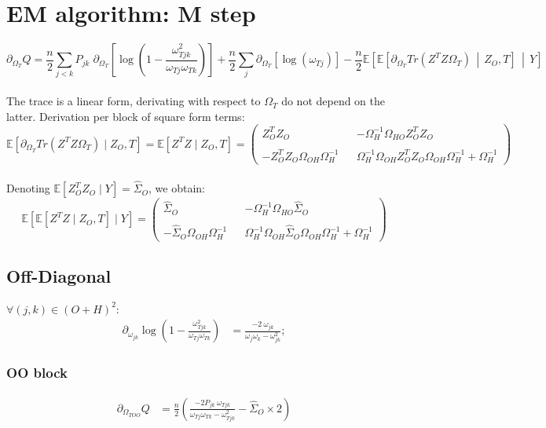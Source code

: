 \documentclass[11pt,a4paper]{article}
\newcommand{\Esp}{\mathds{E}}
\begin{document}
\section{EM algorithm: M step}
$$  \partial_{\Omega_T}Q = \frac{n}{2}\sum_{j<k}P_{jk}\; \partial_{\Omega_T}\left[\log\left(1-\frac{\omega_{Tjk}^2}{\omega_{Tj}\omega_{Tk}}\right)\right]+\frac{n}{2}\sum_j \partial_{\Omega_T} \left[\log(\omega_{Tj})\right] -\frac{n}{2}\Esp\left[\Esp\left[\partial_{\Omega_T} Tr(Z^TZ\Omega_T) \,\middle\vert\, Z_O,T\right] \,\middle\vert\, Y\right]$$ \\

The trace is a linear form, derivating with respect to $\Omega_T$ do not depend on the latter. Derivation per block of square form terms:\\
\[
\Esp[ \partial_{\Omega_T}Tr(Z^TZ\Omega_T) \mid Z_O,T] = \Esp[Z^TZ\mid Z_O,T]=
  \left( {\begin{array}{ccc}
  Z_O^TZ_O && -\Omega_{H}^{-1}\Omega_{HO}Z_O^TZ_O\\\\
  -Z_O^TZ_O\Omega_{OH}\Omega_{H}^{-1} && \Omega_{H}^{-1}\Omega_{OH}Z_O^TZ_O\Omega_{OH}\Omega_{H}^{-1} + \Omega_{H}^{-1}
  \end{array} } \right) 
  \]\\
  
  Denoting $ \Esp\left[Z_O^TZ_O\mid Y\right] = \widehat{\Sigma}_O$, we obtain: \\
  
  \[
 \Esp\left[\Esp[Z^TZ \mid Z_O,T]\mid Y\right]=
  \left( {\begin{array}{ccc}
  \widehat{\Sigma}_O && -\Omega_{H}^{-1}\Omega_{HO}\widehat{\Sigma}_O\\\\
  -\widehat{\Sigma}_O\Omega_{OH}\Omega_{H}^{-1} && \Omega_{H}^{-1}\Omega_{OH}\widehat{\Sigma}_O\Omega_{OH}\Omega_{H}^{-1} + \Omega_{H}^{-1}
  \end{array} } \right) 
  \]
\subsection{Off-Diagonal}
$ \forall (j,k) \in (O+H)^2$:
\begin{align*}
\partial_{\omega_{jk}}\log\left(1-\frac{\omega_{Tjk}^2}{\omega_{Tj}\omega_{Tk}}\right) &= \frac{-2 \: \omega_{jk}}{\omega_j \omega_k -\omega_{jk}^2};
\end{align*}
\subsubsection{OO block}
\begin{align*}
\partial_{\Omega_{TOO
}}Q &= \frac{n}{2}\left( \frac{-2P_{jk} \:\omega_{Tjk}}{\omega_{Tj}\omega_{Tk}-\omega_{Tjk}^2} -  \widehat{\Sigma}_O \times 2\right)
\end{align*}
\end{document}
